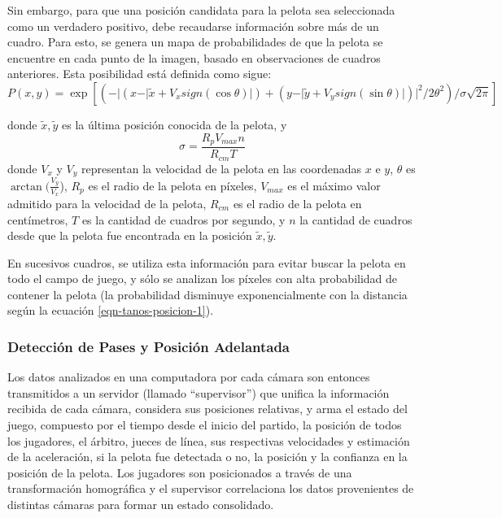 Sin embargo, para que una posición candidata para la pelota sea seleccionada
como un verdadero positivo, debe recaudarse información sobre más de un cuadro.
Para esto, se genera un mapa de probabilidades de que la pelota se encuentre en
cada punto de la imagen, basado en observaciones de cuadros anteriores. Esta
posibilidad está definida como sigue:
\begin{equation}
  \label{eqn-tanos-posicion-1}
  P(x, y) = \exp \left[ (- \vert ( x - \vert \tilde{x} + V_x sign(\cos \theta) \vert )
  + ( y - \vert \tilde{y} + V_y sign(\sin \theta) \vert)\vert ^ 2 / 2\theta^2) /\sigma \sqrt{2\pi} \right]
\end{equation}

donde $\tilde{x},\tilde{y}$ es la última posición conocida de la pelota, y
\[
  \sigma = \frac{R_p V_{max} n}{R_{cm}T}
\]
donde $V_x$ y $V_y$ representan la velocidad de la pelota en las coordenadas
$x$ e $y$, $\theta$ es $\arctan(\tfrac{V_y}{V_x}$), $R_p$ es el radio de la pelota
en píxeles, $V_{max}$ es el máximo valor admitido para la velocidad de la
pelota, $R_{cm}$ es el radio de la pelota en centímetros, $T$ es la cantidad de
cuadros por segundo, y $n$ la cantidad de cuadros desde que la pelota fue
encontrada en la posición $\tilde{x},\tilde{y}$.

En sucesivos cuadros, se utiliza esta información para evitar buscar la pelota
en todo el campo de juego, y sólo se analizan los píxeles con alta probabilidad
de contener la pelota (la probabilidad disminuye exponencialmente con la
distancia según la ecuación \ref{eqn-tanos-posicion-1}).

\subsubsection{Detección de Pases y Posición Adelantada}

Los datos analizados en una computadora por cada cámara son entonces transmitidos
a un servidor (llamado ``supervisor'') que unifica la información recibida de
cada cámara, considera sus posiciones relativas, y arma el estado del juego,
compuesto por el tiempo desde el inicio del partido, la posición de todos los
jugadores, el árbitro, jueces de línea, sus respectivas velocidades y estimación
de la aceleración, si la pelota fue detectada o no, la posición y la confianza
en la posición de la pelota. Los jugadores son posicionados a través de una
transformación homográfica y el supervisor correlaciona los datos provenientes
de distintas cámaras para formar un estado consolidado.

